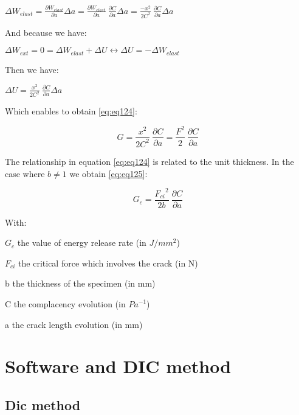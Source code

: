 $\Delta W_{elast}=\frac{\partial W_{elast}}{\partial a}\Delta a=\frac{\partial W_{elast}}{\partial a}\ \frac{\partial C}{\partial a}\Delta a=\frac{-x^2}{2C^2}\ \frac{\partial C}{\partial a}\Delta a$

And because we have:

$\Delta W_{ext}=0=\Delta W_{elast}+\Delta U\leftrightarrow \Delta U =-\Delta W_{elast}$

Then we have:

$\Delta U=\frac{x^2}{2C^2}\ \frac{\partial C}{\partial a}\Delta a$

Which enables to obtain \ref{eq:eq124}:

\begin{equation}
	G=\frac{x^2}{2C^2}\ \frac{\partial C}{\partial a}=\frac{F^2}{2}\ \frac{\partial C}{\partial a}
	\label{eq:eq124}
\end{equation}

The relationship in equation \ref{eq:eq124} is related to the unit thickness. In the case where $b\neq1$
we obtain \ref{eq:eq125}:

\begin{equation}
	G_c=\frac{{F_{ci}}^2}{2b}\ \frac{\partial C}{\partial a}
	\label{eq:eq125}
\end{equation}

With:

$G_c$ the value of energy release rate (in $J/mm^2$)

$F_{ci}$ the critical force which involves the crack (in N)

b the thickness of the specimen (in mm)

C the complacency evolution (in ${Pa}^{-1}$)

a the crack length evolution (in mm)



\section{Software and DIC method}

\subsection{Dic method}


